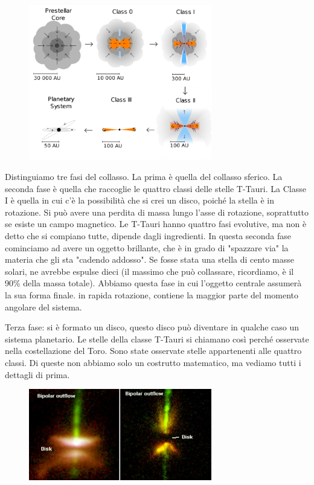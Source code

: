 \begin{figure}[H]
    \centering
    \includegraphics[width=8cm]{lezione 28 novembre/ttauri.png}
    \label{lezione 28 novembre/ttauri.png}
\end{figure}

Distinguiamo tre fasi del collasso. La prima è quella del collasso sferico. La seconda fase è quella che raccoglie le quattro classi delle stelle T-Tauri. La Classe I è quella in cui c'è la possibilità che si crei un disco, poiché la stella è in rotazione. Si può avere una perdita di massa lungo l'asse di rotazione, soprattutto se esiste un campo magnetico. Le T-Tauri hanno quattro fasi evolutive, ma non è detto che si compiano tutte, dipende dagli ingredienti. In questa seconda fase cominciamo ad avere un oggetto brillante, che è in grado di "spazzare via" la materia che gli sta "cadendo addosso". Se fosse stata una stella di cento masse solari, ne avrebbe espulse dieci (il massimo che può collassare, ricordiamo, è il 90\% della massa totale). Abbiamo questa fase in cui l'oggetto centrale assumerà la sua forma finale. \E in rapida rotazione, contiene la maggior parte del momento angolare del sistema.

Terza fase: si è formato un disco, questo disco può diventare in qualche caso un sistema planetario. Le stelle della classe T-Tauri si chiamano così perché osservate nella costellazione del Toro. Sono state osservate stelle appartenenti alle quattro classi. Di queste non abbiamo solo un costrutto matematico, ma vediamo tutti i dettagli di prima.

\begin{figure}[H]
    \centering
    \includegraphics[width=8cm]{lezione 28 novembre/dischigettidimateria.png}
    \label{lezione 28 novembre/dischigettidimateria.png}
\end{figure}

